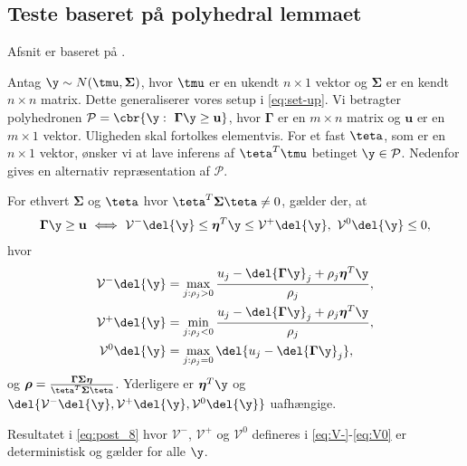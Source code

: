 \subsection{Teste baseret på polyhedral lemmaet} \label{subsec:teste_polyhedron}
Afsnit er baseret på \citep{post_inference}.

Antag \(\y \sim N(\tmu, \boldsymbol{\Sigma})\), hvor \(\tmu\) er en ukendt \(n \times 1\) vektor og \(\boldsymbol{\Sigma}\) er en kendt \(n \times n\) matrix.
Dette generaliserer vores setup i \eqref{eq:set-up}.
Vi betragter polyhedronen \(\mathcal{P} = \cbr{\y : \ \boldsymbol{\Gamma} \y \geq \mathbf{u}}\), hvor \(\boldsymbol{\Gamma}\) er en \(m \times n\) matrix og \(\mathbf{u}\) er en \(m \times 1\) vektor. Uligheden skal fortolkes elementvis.
For et fast \(\teta\), som er en \(n \times 1\) vektor, ønsker vi at lave inferens af \(\teta^T \tmu\) betinget \(\y \in \mathcal{P}\).
Nedenfor gives en alternativ repræsentation af \(\mathcal{P}\).
%
\begin{lem} \label{lem:polyhedral}
For ethvert \(\boldsymbol{\Sigma}\) og \(\teta\) hvor \(\teta^T \boldsymbol{\Sigma} \teta \neq 0\), gælder der, at
\begin{align}
\boldsymbol{\Gamma} \y \geq \mathbf{u} \ \Longleftrightarrow \ \mathcal{V}^- \del{\y} \leq \boldsymbol{\eta}^T \y \leq \mathcal{V}^+ \del{\y}, \  \mathcal{V}^0 \del{\y} \leq 0, \label{eq:post_8}
\end{align}
hvor
\begin{align}
\mathcal{V}^- \del{\y} &= \max_{j: \rho_j > 0} \frac{u_j - \del{\boldsymbol{\Gamma} \y}_j + \rho_j \boldsymbol{\eta}^T \y}{\rho_j}, \label{eq:V-} \\
\mathcal{V}^+ \del{\y} &= \min_{j: \rho_j < 0} \frac{u_j - \del{\boldsymbol{\Gamma} \y}_j + \rho_j \boldsymbol{\eta}^T \y}{\rho_j}, \label{eq:V+} \\
\mathcal{V}^0 \del{\y} &= \max_{j: \rho_j = 0} \del{u_j - \del{\boldsymbol{\Gamma} \y}_j}, \label{eq:V0} 
\end{align}
og \(\boldsymbol{\rho}=\frac{\boldsymbol{\Gamma} \boldsymbol{\Sigma} \boldsymbol{\eta}}{\teta^T \boldsymbol{\Sigma} \teta}\).
Yderligere  er \(\boldsymbol{\eta}^T \y\) og \(\del{\mathcal{V}^-\del{\y}, \mathcal{V}^+\del{\y},\mathcal{V}^0\del{\y}}\) uafhængige. 
\end{lem}
%
Resultatet i \eqref{eq:post_8} hvor \(\mathcal{V}^-\), \(\mathcal{V}^+\) og \(\mathcal{V}^0\) defineres i \eqref{eq:V-}-\eqref{eq:V0} er deterministisk og gælder for alle \(\y\).
